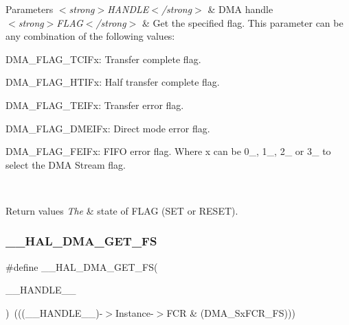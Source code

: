 \begin{DoxyParams}{Parameters}
{\em $<$strong$>$\+H\+A\+N\+D\+L\+E$<$/strong$>$} & D\+MA handle \\
\hline
{\em $<$strong$>$\+F\+L\+A\+G$<$/strong$>$} & Get the specified flag. This parameter can be any combination of the following values\+: \begin{DoxyItemize}
\item D\+M\+A\+\_\+\+F\+L\+A\+G\+\_\+\+T\+C\+I\+Fx\+: Transfer complete flag. \item D\+M\+A\+\_\+\+F\+L\+A\+G\+\_\+\+H\+T\+I\+Fx\+: Half transfer complete flag. \item D\+M\+A\+\_\+\+F\+L\+A\+G\+\_\+\+T\+E\+I\+Fx\+: Transfer error flag. \item D\+M\+A\+\_\+\+F\+L\+A\+G\+\_\+\+D\+M\+E\+I\+Fx\+: Direct mode error flag. \item D\+M\+A\+\_\+\+F\+L\+A\+G\+\_\+\+F\+E\+I\+Fx\+: F\+I\+FO error flag. Where x can be 0\+\_, 1\+\_, 2\+\_ or 3\+\_ to select the D\+MA Stream flag. \end{DoxyItemize}
\\
\hline
\end{DoxyParams}

\begin{DoxyRetVals}{Return values}
{\em The} & state of F\+L\+AG (S\+ET or R\+E\+S\+ET). \\
\hline
\end{DoxyRetVals}
\mbox{\label{group___d_m_a_ga8f0ff408d25904040b9d23ee7f6af080}} 
\subsubsection{\texorpdfstring{\+\_\+\+\_\+\+H\+A\+L\+\_\+\+D\+M\+A\+\_\+\+G\+E\+T\+\_\+\+FS}{\_\_HAL\_DMA\_GET\_FS}}
{\footnotesize\ttfamily \#define \+\_\+\+\_\+\+H\+A\+L\+\_\+\+D\+M\+A\+\_\+\+G\+E\+T\+\_\+\+FS(\begin{DoxyParamCaption}\item[{}]{\+\_\+\+\_\+\+H\+A\+N\+D\+L\+E\+\_\+\+\_\+ }\end{DoxyParamCaption})~(((\+\_\+\+\_\+\+H\+A\+N\+D\+L\+E\+\_\+\+\_\+)-\/$>$Instance-\/$>$F\+CR \& (D\+M\+A\+\_\+\+Sx\+F\+C\+R\+\_\+\+FS)))}



